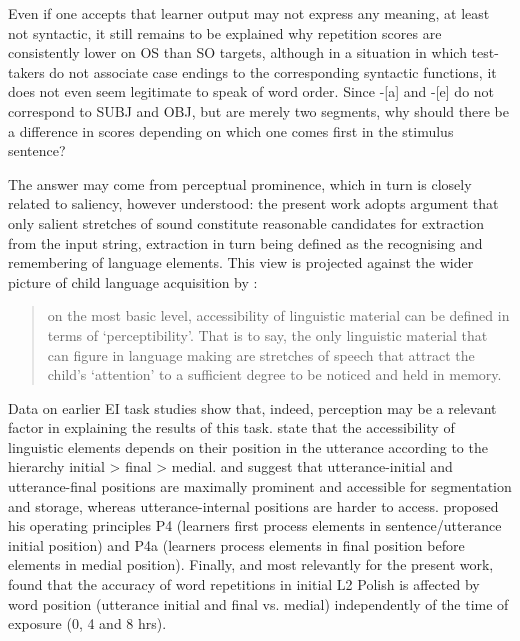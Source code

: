 Even if one accepts that learner output may not express any meaning, at least not syntactic, it still remains to be explained why repetition scores are consistently lower on OS than SO targets, although in a situation in which test-takers do not associate case endings to the corresponding syntactic functions, it does not even seem legitimate to speak of word order. Since -[a] and -[e] do not correspond to SUBJ and OBJ, but are merely two segments, why should there be a difference in scores depending on which one comes first in the stimulus sentence?

The answer may come from perceptual prominence, which in turn is closely related to saliency, however understood: the present work adopts  argument that only salient stretches of sound constitute reasonable candidates for extraction from the input string, extraction in turn being defined as the recognising and remembering of language elements. This view is projected against the wider picture of child language acquisition by \citet[1164]{Slobin1985}: 

\begin{quote}
on the most basic level, accessibility of linguistic material can be defined in terms of ‘perceptibility’. That is to say, the only linguistic material that can figure in language making are stretches of speech that attract the child’s ‘attention’ to a sufficient degree to be noticed and held in memory.
\end{quote}

Data on earlier EI task studies show that, indeed, perception may be a relevant factor in explaining the results of this task. \citet{GallimoreTharp1981} state that the accessibility of linguistic elements depends on their position in the utterance according to the hierarchy initial > final > medial. \citet{Peters1985} and \citet[1166]{Slobin1985} suggest that utterance-initial and utterance-final positions are maximally prominent and accessible for segmentation and storage, whereas utterance-internal positions are harder to access. \citet[300]{VanPatten2000} proposed his operating principles P4 (learners first process elements in sentence/utterance initial position) and P4a (learners process elements in final position before elements in medial position). Finally, and most relevantly for the present work, \citet[151]{Rast2008} found that the accuracy of word repetitions in initial L2 Polish is affected by word position (utterance initial and final vs. medial) independently of the time of exposure (0, 4 and 8 hrs). 

